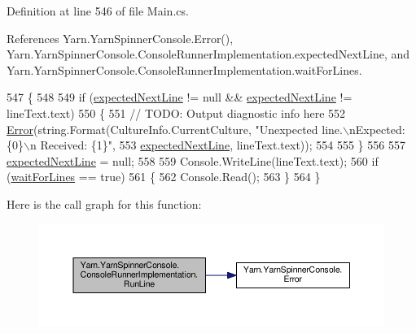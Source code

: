 Definition at line 546 of file Main.\-cs.



References Yarn.\-Yarn\-Spinner\-Console.\-Error(), Yarn.\-Yarn\-Spinner\-Console.\-Console\-Runner\-Implementation.\-expected\-Next\-Line, and Yarn.\-Yarn\-Spinner\-Console.\-Console\-Runner\-Implementation.\-wait\-For\-Lines.


\begin{DoxyCode}
547             \{
548 
549                 \textcolor{keywordflow}{if} (\hyperlink{a00058_a33a44e39f2d90850cee234dfad50f2c5}{expectedNextLine} != null && \hyperlink{a00058_a33a44e39f2d90850cee234dfad50f2c5}{expectedNextLine} != 
      lineText.text)
550                 \{
551                     \textcolor{comment}{// TODO: Output diagnostic info here}
552                     \hyperlink{a00197_a2f63f9f5b7634cb50ee75ff2eb18b137}{Error}(\textcolor{keywordtype}{string}.Format(CultureInfo.CurrentCulture, \textcolor{stringliteral}{"Unexpected line.\(\backslash\)nExpected: \{0\}\(\backslash\)n
      Received: \{1\}"},
553                         \hyperlink{a00058_a33a44e39f2d90850cee234dfad50f2c5}{expectedNextLine}, lineText.text));
554 
555                 \}
556 
557                 \hyperlink{a00058_a33a44e39f2d90850cee234dfad50f2c5}{expectedNextLine} = null;
558 
559                 Console.WriteLine(lineText.text);
560                 \textcolor{keywordflow}{if} (\hyperlink{a00058_a90b0c755ea1d2f3ffaffa6cf18266709}{waitForLines} == \textcolor{keyword}{true})
561                 \{
562                     Console.Read();
563                 \}
564             \}
\end{DoxyCode}


Here is the call graph for this function\-:
\nopagebreak
\begin{figure}[H]
\begin{center}
\leavevmode
\includegraphics[width=350pt]{a00058_a13bc6c3a8ba43223a20befae50dbbcb4_cgraph}
\end{center}
\end{figure}


